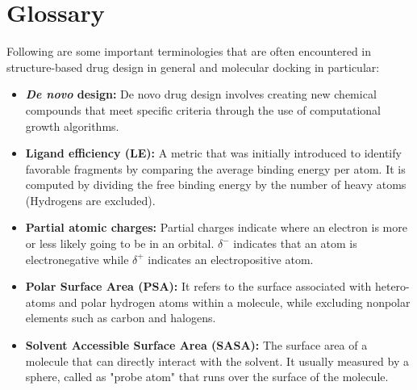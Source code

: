 \chapter{Glossary}

Following are some important terminologies that are often encountered in structure-based drug design in general and molecular docking in particular: 
\begin{itemize}
    \item \textbf{\textit{De novo} design:} De novo drug design involves creating new chemical compounds that meet specific criteria through the use of computational growth algorithms. 
    \item \textbf{Ligand efficiency (LE):} A metric that was initially introduced to identify favorable fragments by comparing the average binding energy per atom. It is computed by dividing the free binding energy by the number of heavy atoms (Hydrogens are excluded).
    \item \textbf{Partial atomic charges:} Partial charges indicate where an electron is more or less likely going to be in an orbital. $ \delta^-$ indicates that an atom is electronegative while $ \delta^+$ indicates an electropositive atom. 
    \item \textbf{Polar Surface Area (PSA):} It refers to the surface associated with hetero-atoms and polar hydrogen atoms within a molecule, while excluding nonpolar elements such as carbon and halogens. 
    \item \textbf{Solvent Accessible Surface Area (SASA):} The surface area of a molecule that can directly interact with the solvent. It usually measured by a sphere, called as "probe atom" that runs over the surface of the molecule. 
\end{itemize}